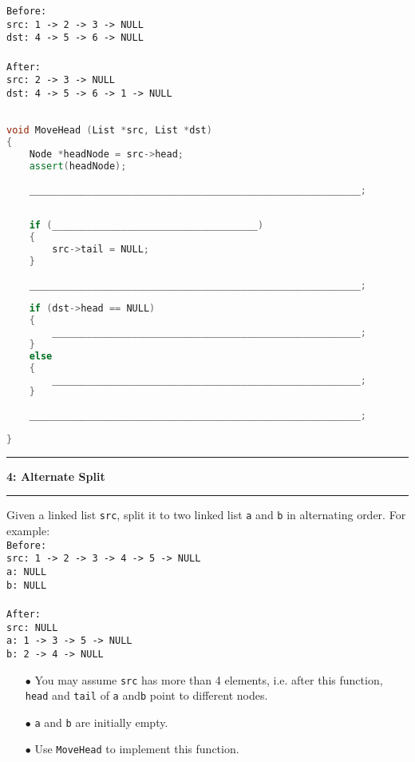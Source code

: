 \documentclass[10.5pt]{article}
\newcommand\question[2]{\vspace{.25in}\hrule\textbf{#1: #2}\vspace{.5em}\hrule\vspace{.10in}}
\begin{document}
\texttt{Before:}\\
\texttt{src: 1 -> 2 -> 3 -> NULL}\\
\texttt{dst: 4 -> 5 -> 6 -> NULL}\\
\\
\texttt{After:}\\
\texttt{src: 2 -> 3 -> NULL}\\
\texttt{dst: 4 -> 5 -> 6 -> 1 -> NULL}\\


\hrulefill
\begin{lstlisting}[language=C++]

void MoveHead (List *src, List *dst)
{
    Node *headNode = src->head;
    assert(headNode);
    
    __________________________________________________________;
    
        
    if (____________________________________)
    {
        src->tail = NULL;
    }
    
    __________________________________________________________;
    
    if (dst->head == NULL)
    {
        ______________________________________________________;
    }
    else
    {
        ______________________________________________________;
    }
    
    __________________________________________________________;
    
}

\end{lstlisting}
\pagebreak

\question{4}{Alternate Split}
Given a linked list \texttt{src}, split it to two linked list  \texttt{a} and \texttt{b} in alternating order. For example:\\

\texttt{Before:}\\
\texttt{src: 1 -> 2 -> 3 -> 4 -> 5 -> NULL}\\
\texttt{a: NULL}\\
\texttt{b: NULL}\\
\\
\texttt{After:}\\
\texttt{src: NULL}\\
\texttt{a: 1 -> 3 -> 5 -> NULL}\\
\texttt{b: 2 -> 4 -> NULL}\\

\begin{enumerate}
	\item[$\bullet$] You may assume \texttt{src} has more than 4 elements, i.e. after this function, \texttt{head} and \texttt{tail} of \texttt{a} and\texttt{b} point to different nodes.
	\item[$\bullet$] \texttt{a} and \texttt{b} are initially empty.
	\item[$\bullet$] Use \texttt{MoveHead} to implement this function.
\end{enumerate}
\end{document}
